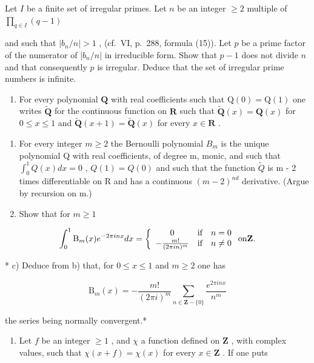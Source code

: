 Let \(I\) be a finite set of irregular primes. Let \(n\) be an integer \(\geqslant 2\) multiple of \(\prod_{q \in I} (q - 1)\)

and such that \(|b_n / n| > 1\) , (cf.~VI, p.~288, formula (15)). Let \(p\) be a prime factor of the numerator of \(|b_n / n|\) in irreducible form. Show that \(p - 1\) does not divide \(n\) and that consequently \(p\) is irregular. Deduce that the set of irregular prime numbers is infinite.

\begin{enumerate}
\def\labelenumi{\arabic{enumi})}
\setcounter{enumi}{11}
\tightlist
\item
  For every polynomial \(\mathbf{Q}\) with real coefficients such that \(\mathrm{Q}(0) = \mathrm{Q}(1)\) one writes \(\tilde{\mathbf{Q}}\) for the continuous function on \(\mathbf{R}\) such that \(\tilde{\mathbf{Q}}(x) = \mathbf{Q}(x)\) for \(0 \leqslant x \leqslant 1\) and \(\tilde{\mathbf{Q}}(x + 1) = \tilde{\mathbf{Q}}(x)\) for every \(x \in \mathbf{R}\) .
\end{enumerate}

\begin{enumerate}
\def\labelenumi{\alph{enumi})}
\item
  For every integer \(m \geqslant 2\) the Bernoulli polynomial \(B_{m}\) is the unique polynomial Q with real coefficients, of degree m, monic, and such that \(\int_{0}^{1} Q(x) dx = 0\) , \(Q(1) = Q(0)\) and such that the function \(\tilde{Q}\) is m - 2 times differentiable on R and has a continuous \((m - 2)^{nd}\) derivative. (Argue by recursion on m.)
\item
  Show that for \(m \geqslant 1\)
\end{enumerate}

\[
\int_ {0} ^ {1} \mathrm{B} _ {m} (x) e ^ {- 2 \pi i n x} d x = \left\{ \begin{array}{c c c} 0 & \text {if} & n = 0 \\ - \frac {m !}{(2 \pi i n) ^ {m}} & \text {if} & n \neq 0 \end{array} \right. \text {on} \mathbf {Z}.
\]

* c) Deduce from b) that, for \(0 \leqslant x \leqslant 1\) and \(m \geqslant 2\) one has

\[
\mathrm{B} _ {m} (x) = - \frac {m !}{(2 \pi i) ^ {m}} \sum_ {n \in \mathbf {Z} - \{0 \}} \frac {e ^ {2 \pi i n x}}{n ^ {m}}
\]

the series being normally convergent.*

\begin{enumerate}
\def\labelenumi{\arabic{enumi})}
\setcounter{enumi}{12}
\tightlist
\item
  Let \(f\) be an integer \(\geqslant 1\) , and \(\chi\) a function defined on \(\mathbf{Z}\) , with complex values, such that \(\chi(x + f) = \chi(x)\) for every \(x \in \mathbf{Z}\) . If one puts
\end{enumerate}

